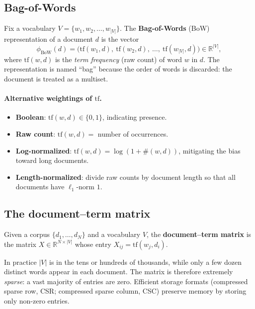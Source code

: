 \subsection{Bag-of-Words}

\begin{definition}
Fix a vocabulary $V = \{w_1, w_2, \dots, w_{|V|}\}$. The \textbf{Bag-of-Words} (BoW) representation of a document $d$ is the vector
\[ \phi_{\text{BoW}}(d) = \big(\mathrm{tf}(w_1, d),\ \mathrm{tf}(w_2, d),\ \dots,\ \mathrm{tf}(w_{|V|}, d)\big) \in \mathbb{R}^{|V|}, \]
where $\mathrm{tf}(w, d)$ is the \emph{term frequency} (raw count) of word $w$ in $d$. The representation is named ``bag'' because the order of words is discarded: the document is treated as a multiset.
\end{definition}

\paragraph{Alternative weightings of $\mathrm{tf}$.}
\begin{itemize}
    \item \textbf{Boolean}: $\mathrm{tf}(w, d) \in \{0, 1\}$, indicating presence.
    \item \textbf{Raw count}: $\mathrm{tf}(w, d) = $ number of occurrences.
    \item \textbf{Log-normalized}: $\mathrm{tf}(w, d) = \log(1 + \#(w, d))$, mitigating the bias toward long documents.
    \item \textbf{Length-normalized}: divide raw counts by document length so that all documents have $\ell_1$-norm $1$.
\end{itemize}

\subsection{The document--term matrix}

\begin{definition}
Given a corpus $\{d_1, \dots, d_N\}$ and a vocabulary $V$, the \textbf{document--term matrix} is the matrix $X \in \mathbb{R}^{N \times |V|}$ whose entry $X_{ij} = \mathrm{tf}(w_j, d_i)$.
\end{definition}

In practice $|V|$ is in the tens or hundreds of thousands, while only a few dozen distinct words appear in each document. The matrix is therefore extremely \emph{sparse}: a vast majority of entries are zero. Efficient storage formats (compressed sparse row, CSR; compressed sparse column, CSC) preserve memory by storing only non-zero entries.

